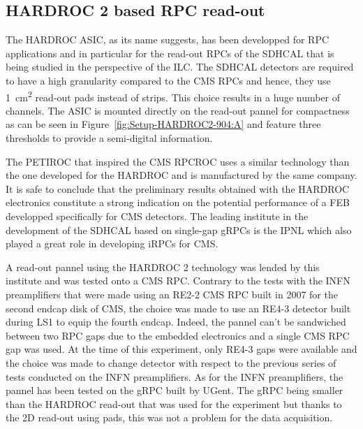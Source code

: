 	\subsection{HARDROC 2 based RPC read-out}
	\label{chapt6:ssec:HARDROC2}
	
	The \acf{HARDROC} ASIC, as its name suggests, has been developped for RPC applications and in particular for the read-out RPCs of the \acf{SDHCAL} that is being studied in the perspective of the \acf{ILC}. The SDHCAL detectors are required to have a high granularity compared to the CMS RPCs and hence, they use \SI{1}{cm^2} read-out pads instead of strips. This choice results in a huge number of channels. The ASIC is mounted directly on the read-out pannel for compactness as can be seen in Figure~\ref{fig:Setup-HARDROC2-904:A} and feature three thresholds to provide a semi-digital information.
	
	The PETIROC that inspired the CMS RPCROC uses a similar technology than the one developed for the HARDROC and is manufactured by the same company. It is safe to conclude that the preliminary results obtained with the HARDROC electronics constitute a strong indication on the potential performance of a FEB developped specifically for CMS detectors. The leading institute in the development of the SDHCAL based on single-gap \acf{gRPCs} is the \acf{IPNL} which also played a great role in developing iRPCs for CMS.
	
	A read-out pannel using the HARDROC 2 technology was lended by this institute and was tested onto a CMS RPC. Contrary to the tests with the INFN preamplifiers that were made using an RE2-2 CMS RPC built in 2007 for the second endcap disk of CMS, the choice was made to use an RE4-3 detector built during LS1 to equip the fourth endcap. Indeed, the pannel can't be sandwiched between two RPC gaps due to the embedded electronics and a single CMS RPC gap was used. At the time of this experiment, only RE4-3 gaps were available and the choice was made to change detector with respect to the previous series of tests conducted on the INFN preamplifiers. As for the INFN preamplifiers, the pannel has been tested on the gRPC built by UGent. The gRPC being smaller than the HARDROC read-out that was used for the experiment but thanks to the 2D read-out using pads, this was not a problem for the data acquisition.
	 
